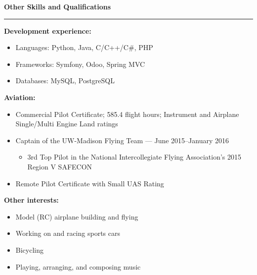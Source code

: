 \documentclass[12pt,letterpaper]{article}
\newenvironment{details}{
    \vspace{-.8em}
    \begin{itemize}
        \renewcommand \labelitemi{\labelitemiv}
        \setlength{\itemsep}{0pt}
        \setlength{\parskip}{-1pt}
        \setlength{\parsep}{0pt}
    }{
    \end{itemize}
    \vspace{-.5em}
}
\newcommand{\hr} {
    \vspace{-1em}
    \par\rule{\textwidth}{1pt}
    \vspace{-1.5em}
}
\newcommand{\ressection}[1] {
    \par{\large \textbf{#1}}
    \hr
}
\newenvironment{other} {
    \ressection{Other Skills and Qualifications}
    \setlength{\parskip}{3pt}
}{
    \vspace{0.5em}
}
\begin{document}
\begin{other}
\par \textbf{Development experience:}
\vspace{1pt}
\begin{details}
    \item Languages: Python, Java, C/C++/C\#, PHP
    \item Frameworks: Symfony, Odoo, Spring MVC
    \item Databases: MySQL, PostgreSQL
\end{details}

\par \textbf{Aviation:}
\vspace{1pt}
\begin{details}
    \item Commercial Pilot Certificate; 585.4 flight hours; Instrument and Airplane Single/Multi Engine Land ratings
    \item Captain of the UW-Madison Flying Team --- June 2015--January 2016
    \vspace{.5em}
    \begin{details}
        \item 3rd Top Pilot in the National Intercollegiate Flying Association's 2015 Region V SAFECON
    \end{details}
    \item Remote Pilot Certificate with Small UAS Rating
\end{details}

\par \textbf{Other interests:}
\vspace{1pt}
\begin{details}
    \item Model (RC) airplane building and flying
    \item Working on and racing sports cars
    \item Bicycling
    \item Playing, arranging, and composing music
\end{details}

\end{other}
\end{document}
